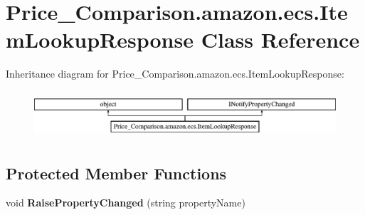 \hypertarget{class_price___comparison_1_1amazon_1_1ecs_1_1_item_lookup_response}{\section{Price\-\_\-\-Comparison.\-amazon.\-ecs.\-Item\-Lookup\-Response Class Reference}
\label{class_price___comparison_1_1amazon_1_1ecs_1_1_item_lookup_response}
}


 


Inheritance diagram for Price\-\_\-\-Comparison.\-amazon.\-ecs.\-Item\-Lookup\-Response\-:\begin{figure}[H]
\begin{center}
\leavevmode
\includegraphics[height=1.766562cm]{class_price___comparison_1_1amazon_1_1ecs_1_1_item_lookup_response}
\end{center}
\end{figure}
\subsection*{Protected Member Functions}
\begin{DoxyCompactItemize}
\item 
\hypertarget{class_price___comparison_1_1amazon_1_1ecs_1_1_item_lookup_response_a8b6d6b6c1f56dbddb213bc3452cb3815}{void {\bfseries Raise\-Property\-Changed} (string property\-Name)}\label{class_price___comparison_1_1amazon_1_1ecs_1_1_item_lookup_response_a8b6d6b6c1f56dbddb213bc3452cb3815}

\end{DoxyCompactItemize}
